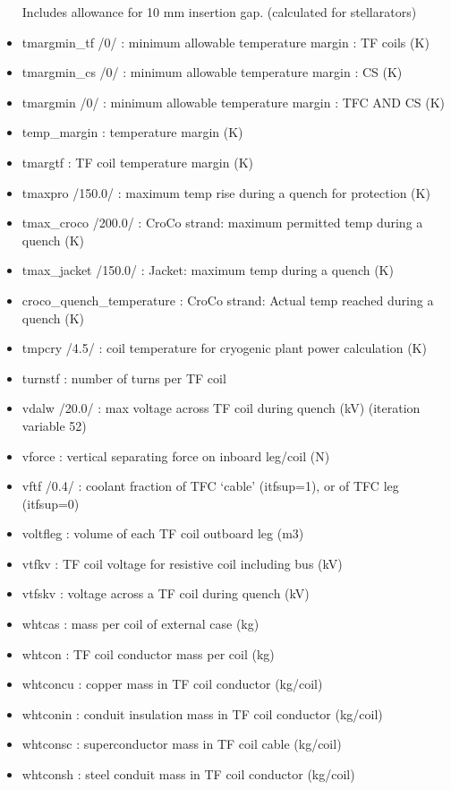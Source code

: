\documentclass[]{article}
\begin{document}
\begin{itemize}
  Includes allowance for 10 mm insertion gap. (calculated for
  stellarators)
\item
  tmargmin\_tf /0/ : minimum allowable temperature margin : TF coils (K)
\item
  tmargmin\_cs /0/ : minimum allowable temperature margin : CS (K)
\item
  tmargmin /0/ : minimum allowable temperature margin : TFC AND CS (K)
\item
  temp\_margin : temperature margin (K)
\item
  tmargtf : TF coil temperature margin (K)
\item
  tmaxpro /150.0/ : maximum temp rise during a quench for protection (K)
\item
  tmax\_croco /200.0/ : CroCo strand: maximum permitted temp during a
  quench (K)
\item
  tmax\_jacket /150.0/ : Jacket: maximum temp during a quench (K)
\item
  croco\_quench\_temperature : CroCo strand: Actual temp reached during
  a quench (K)
\item
  tmpcry /4.5/ : coil temperature for cryogenic plant power calculation
  (K)
\item
  turnstf : number of turns per TF coil
\item
  vdalw /20.0/ : max voltage across TF coil during quench (kV)
  (iteration variable 52)
\item
  vforce : vertical separating force on inboard leg/coil (N)
\item
  vftf /0.4/ : coolant fraction of TFC `cable' (itfsup=1), or of TFC leg
  (itfsup=0)
\item
  voltfleg : volume of each TF coil outboard leg (m3)
\item
  vtfkv : TF coil voltage for resistive coil including bus (kV)
\item
  vtfskv : voltage across a TF coil during quench (kV)
\item
  whtcas : mass per coil of external case (kg)
\item
  whtcon : TF coil conductor mass per coil (kg)
\item
  whtconcu : copper mass in TF coil conductor (kg/coil)
\item
  whtconin : conduit insulation mass in TF coil conductor (kg/coil)
\item
  whtconsc : superconductor mass in TF coil cable (kg/coil)
\item
  whtconsh : steel conduit mass in TF coil conductor (kg/coil)

\end{itemize}
\end{document}
